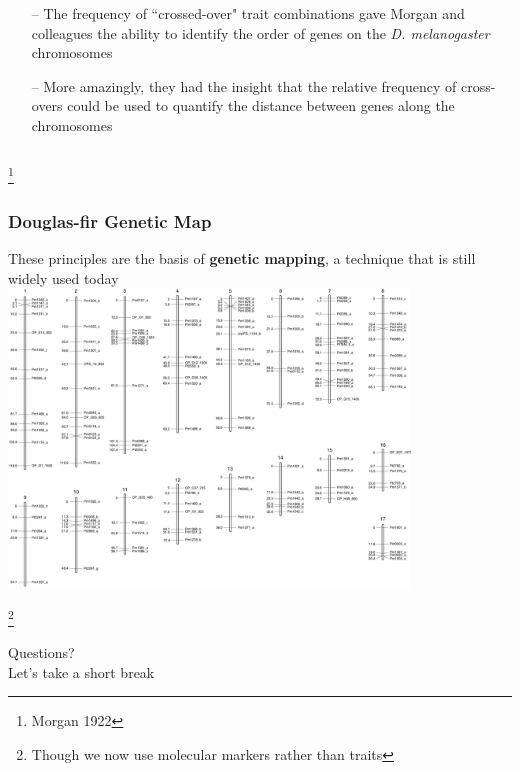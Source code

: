 \documentclass{beamer}
\newcommand\blfootnote[1]{%
	\begingroup
	\renewcommand\thefootnote{}\footnote{#1}%
	\addtocounter{footnote}{-1}%
	\endgroup
}
\begin{document}
\begin{frame}
\begin{columns}
\begin{column}{0.6\textwidth}
			\begin{itemize}			
				\item[--] The frequency of ``crossed-over" trait combinations gave Morgan and colleagues the ability to identify the order of genes on the \textit{D. melanogaster} chromosomes 
				\item[--] More amazingly, they had the insight that the relative frequency of cross-overs could be used to quantify the distance between genes along the chromosomes
				
			\end{itemize}
			
		\end{column}
	\end{columns}
	\blfootnote{Morgan 1922}
\end{frame}

\begin{frame}
	\frametitle{Douglas-fir Genetic Map}
These principles are the basis of \textbf{genetic mapping}, a technique that is still widely used today\\
	
				\centering	\includegraphics[keepaspectratio, width  =0.8\textwidth]{img/DougFirMap} 
				
\blfootnote{Though we now use molecular markers rather than traits}
\end{frame}





\begin{frame}
			
			\Huge
			Questions? \\ \pause
			Let's take a short break
			
\end{frame}
		
\end{document}
